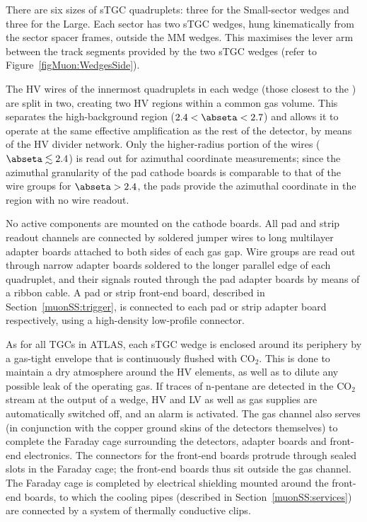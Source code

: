 \documentclass[cernpreprint, atlasdraft=false, UKenglish,british,orcidlogo, texmf, orcidlogo]{atlasdoc}
\begin{document}
There are six sizes of \gls{sTGC} quadruplets: three for the Small-sector wedges and three for the Large.
Each sector has two \gls{sTGC} wedges, hung kinematically from the sector spacer frames, outside the \gls{MM} wedges. This maximises the lever arm between the track segments provided by the two \gls{sTGC} wedges (refer to Figure~\ref{figMuon:WedgesSide}).
 
The \gls{HV} wires of the innermost quadruplets in each wedge (those closest to the \beampipe) are split in two, creating two \gls{HV} regions within a common gas volume.
This separates the high-background region ($2.4<\abseta <2.7$) and allows it to operate at the same effective amplification as the rest of the detector, by means of the \gls{HV} divider network.
Only the higher-radius portion of the wires ($\abseta\lesssim 2.4$) is read out for azimuthal coordinate measurements;
since the azimuthal granularity of the pad cathode boards is comparable to that of the wire groups for $\abseta > 2.4$, the pads provide the azimuthal coordinate in the region with no wire readout.
 
No active components are mounted on the cathode boards. All pad and strip readout channels are connected by soldered jumper wires to long multilayer adapter boards attached to both sides of each gas gap. Wire groups are read out through narrow adapter boards soldered to the longer parallel edge of each quadruplet, and their signals routed through the pad adapter boards by means of a ribbon cable.
A pad or strip front-end board, described in Section~\ref{muonSS:trigger}, is connected to each pad or strip adapter board respectively, using a high-density low-profile connector. 
 
 
As for all \glspl{TGC} in ATLAS, each \gls{sTGC} wedge is enclosed around its periphery by a gas-tight envelope that is continuously flushed with CO$_2$. This is done to maintain a dry atmosphere around the \gls{HV} elements, as well as to dilute any possible leak of the operating gas. If traces of n-pentane are detected in the CO$_2$ stream at the output of a wedge, \gls{HV} and \gls{LV} as well as gas supplies are automatically switched off, and an alarm is activated.
The gas channel also serves (in conjunction with the copper ground skins of the detectors themselves) to complete the Faraday cage surrounding the detectors, adapter boards and front-end electronics.
The connectors for the front-end boards protrude through sealed slots in the Faraday cage; the front-end boards thus sit outside the gas channel.
The Faraday cage is completed by electrical shielding mounted around the front-end boards, to which the cooling pipes (described in Section~\ref{muonSS:services}) are connected by a system of thermally conductive clips.
 
\end{document}
